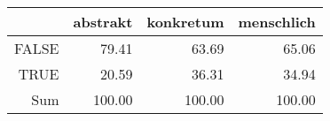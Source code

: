 \begin{tabular}{rrrr}
  \hline
 & abstrakt & konkretum & menschlich \\ 
  \hline
FALSE & 79.41 & 63.69 & 65.06 \\ 
  TRUE & 20.59 & 36.31 & 34.94 \\ 
  Sum & 100.00 & 100.00 & 100.00 \\ 
   \hline
\end{tabular}
